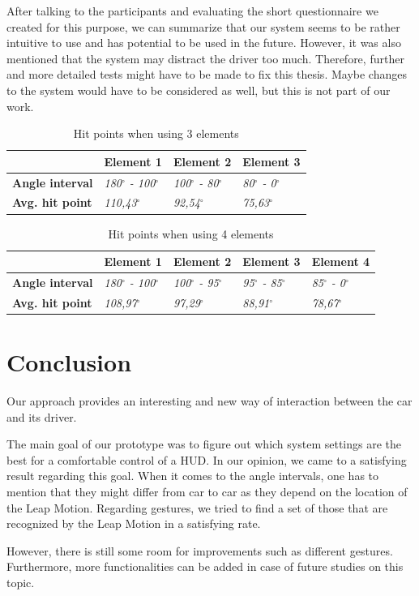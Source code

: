 \documentclass{sigchi-ext}
\begin{document}
After talking to the participants and evaluating the short questionnaire we created for this purpose, we can summarize that our system seems to be rather intuitive to use and has potential to be used in the future. However, it was also mentioned that the system may distract the driver too much. Therefore, further and more detailed tests might have to be made to fix this thesis. Maybe changes to the system would have to be considered as well, but this is not part of our work.

\begin{table}
\begin{tabular}{|l|l|l|l|}
\hline
  & \textbf{Element 1} & \textbf{Element 2} & \textbf{Element 3} \\
\hline
\textbf{Angle interval} & \textit{180$^\circ$ - 100$^\circ$} & \textit{100$^\circ$ - 80$^\circ$} & \textit{80$^\circ$ - 0$^\circ$} \\
\hline
\textbf{Avg. hit point} & \textit{110,43$^\circ$} & \textit{92,54$^\circ$} & \textit{75,63$^\circ$} \\
\hline
\end{tabular}
\caption{Hit points when using 3 elements}
\end{table}

\begin{table}
\begin{tabular}{|l|l|l|l|l|}
\hline
  & \textbf{Element 1} & \textbf{Element 2} & \textbf{Element 3} & \textbf{Element 4} \\
\hline
\textbf{Angle interval} & \textit{180$^\circ$ - 100$^\circ$} & \textit{100$^\circ$ - 95$^\circ$} & \textit{95$^\circ$ - 85$^\circ$} & \textit{85$^\circ$ - 0$^\circ$} \\
\hline
\textbf{Avg. hit point} & \textit{108,97$^\circ$} & \textit{97,29$^\circ$} & \textit{88,91$^\circ$} & \textit{78,67$^\circ$} \\
\hline
\end{tabular}
\caption{Hit points when using 4 elements}
\end{table}

\section{Conclusion}
Our approach provides an interesting and new way of interaction between the car and its driver. 

The main goal of our prototype was to figure out which system settings are the best for a comfortable control of a HUD. In our opinion, we came to a satisfying result regarding this goal. When it comes to the angle intervals, one has to mention that they might differ from car to car as they depend on the location of the Leap Motion. Regarding gestures, we tried to find a set of those that are recognized by the Leap Motion in a satisfying rate.

However, there is still some room for improvements such as different gestures. Furthermore, more functionalities can be added in case of future studies on this topic.



\end{document}
